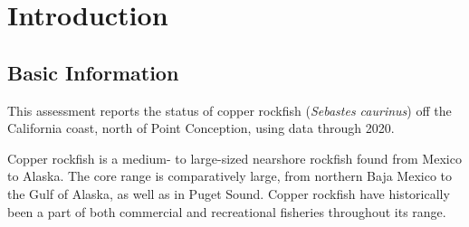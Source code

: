 \documentclass[11pt,
  english,
  a4paper,
]{article}
\begin{document}
\newcommand{\lt}{\ensuremath <}
\newcommand{\gt}{\ensuremath >}

\setcounter{page}{1}

\renewcommand{\thetable}{\roman{table}}
\renewcommand{\thefigure}{\roman{figure}}

\setlength\parskip{0.5em plus 0.1em minus 0.2em}

\vspace{500cm}

\pagebreak

\pagebreak
\setlength{\parskip}{5mm plus1mm minus1mm}
\setcounter{page}{1}
\renewcommand{\thefigure}{\arabic{figure}}
\renewcommand{\thetable}{\arabic{table}}

\setcounter{table}{0}
\setcounter{figure}{0}

\setlength\parskip{0.5em plus 0.1em minus 0.2em}


\hypertarget{introduction}{%
\section{Introduction}\label{introduction}}

\leavevmode\tagmcend\tagstructend


\hypertarget{basic-information}{%
\subsection{Basic Information}\label{basic-information}}

\leavevmode\tagmcend\tagstructend


This assessment reports the status of copper rockfish (\emph{Sebastes caurinus}) off the California coast, north of Point Conception, using data through 2020.

\leavevmode\tagmcend\tagstructend\par


Copper rockfish is a medium- to large-sized nearshore rockfish found from Mexico to Alaska. The core range is comparatively large, from northern Baja Mexico to the Gulf of Alaska, as well as in Puget Sound. Copper rockfish have historically been a part of both commercial and recreational fisheries throughout its range.
\end{document}
